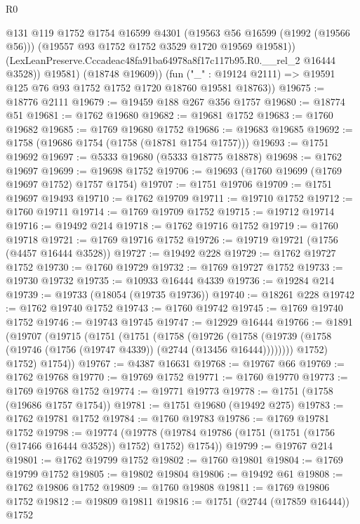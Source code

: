 \begin{lexlean}{R0}
\begin{coremodule}
              @131
              @119
              @1752
              @1754
              @16599
              @4301
              (@19563 @56 @16599 (@1992 (@19566 @56)))
              (@19557 @93 @1752 @1752 @3529 @1720 @19569 @19581))
            (LexLeanPreserve.Cccadeac48fa91ba64978a8f17c117b95.R0.__rel_2 @16444 @3528))
          @19581)
        (@18748 @19609))
      (fun ("_" : @19124 @2111) => @19591 @125 @76 @93 @1752 @1752 @1720 @18760 @19581 @18763))
@19675 := @18776 @2111
@19679 := @19459 @188 @267 @356 @1757
@19680 := @18774 @51
@19681 := @1762 @19680
@19682 := @19681 @1752
@19683 := @1760 @19682
@19685 := @1769 @19680 @1752
@19686 := @19683 @19685
@19692 := @1758 (@19686 @1754 (@1758 (@18781 @1754 @1757)))
@19693 := @1751 @19692
@19697 := @5333 @19680 (@5333 @18775 @18878)
@19698 := @1762 @19697
@19699 := @19698 @1752
@19706 := @19693 (@1760 @19699 (@1769 @19697 @1752) @1757 @1754)
@19707 := @1751 @19706
@19709 := @1751 @19697 @19493
@19710 := @1762 @19709
@19711 := @19710 @1752
@19712 := @1760 @19711
@19714 := @1769 @19709 @1752
@19715 := @19712 @19714
@19716 := @19492 @214
@19718 := @1762 @19716 @1752
@19719 := @1760 @19718
@19721 := @1769 @19716 @1752
@19726 := @19719 @19721 (@1756 (@4457 @16444 @3528))
@19727 := @19492 @228
@19729 := @1762 @19727 @1752
@19730 := @1760 @19729
@19732 := @1769 @19727 @1752
@19733 := @19730 @19732
@19735 := @10933 @16444 @4339
@19736 := @19284 @214
@19739 := @19733 (@18054 (@19735 @19736))
@19740 := @18261 @228
@19742 := @1762 @19740 @1752
@19743 := @1760 @19742
@19745 := @1769 @19740 @1752
@19746 := @19743 @19745
@19747 := @12929 @16444
@19766 := @1891
    (@19707
      (@19715
        (@1751
          (@1751
            (@1758
              (@19726
                (@1758 (@19739 (@1758 (@19746 (@1756 (@19747 @4339)) (@2744 (@13456 @16444))))))))
            @1752)
          @1752)
        @1754))
@19767 := @4387 @16631
@19768 := @19767 @66
@19769 := @1762 @19768
@19770 := @19769 @1752
@19771 := @1760 @19770
@19773 := @1769 @19768 @1752
@19774 := @19771 @19773
@19778 := @1751 (@1758 (@19686 @1757 @1754))
@19781 := @1751 @19680 (@19492 @275)
@19783 := @1762 @19781 @1752
@19784 := @1760 @19783
@19786 := @1769 @19781 @1752
@19798 := @19774
    (@19778 (@19784 @19786 (@1751 (@1751 (@1756 (@17466 @16444 @3528)) @1752) @1752) @1754))
@19799 := @19767 @214
@19801 := @1762 @19799 @1752
@19802 := @1760 @19801
@19804 := @1769 @19799 @1752
@19805 := @19802 @19804
@19806 := @19492 @61
@19808 := @1762 @19806 @1752
@19809 := @1760 @19808
@19811 := @1769 @19806 @1752
@19812 := @19809 @19811
@19816 := @1751 (@2744 (@17859 @16444)) @1752

\end{coremodule}
\end{lexlean}
